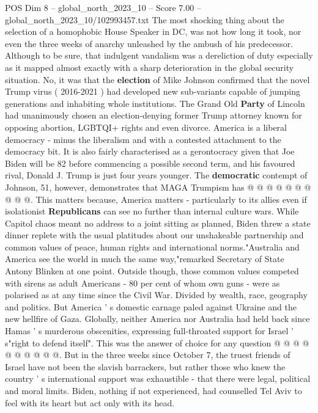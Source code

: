 \begin{textsample}{POS Dim 8 – global\_north\_2023\_10 – Score 7.00 – global\_north\_2023\_10/102993457.txt}  \label{ex:f8_pos_243}
The most shocking thing about the selection of a homophobic House Speaker in DC, was not how long it took, nor even the three weeks of anarchy unleashed by the ambush of his predecessor.
Although to be sure, that indulgent vandalism was a dereliction of duty especially as it mapped almost exactly with a sharp deterioration in the global security situation.
No, it was that the \textbf{election} of Mike Johnson confirmed that the novel Trump virus ( 2016-2021 ) had developed new sub-variants capable of jumping generations and inhabiting whole institutions.
The Grand Old \textbf{Party} of Lincoln had unanimously chosen an election-denying former Trump attorney known for opposing abortion, LGBTQI+ rights and even divorce.
America is a liberal democracy - minus the liberalism and with a contested attachment to the democracy bit.
It is also fairly characterised as a gerontocracy given that Joe Biden will be 82 before commencing a possible second term, and his favoured rival, Donald J.
Trump is just four years younger.
The \textbf{democratic} contempt of Johnson, 51, however, demonstrates that MAGA Trumpism has @ @ @ @ @ @ @ @ @ @.
This matters because, America matters - particularly to its allies even if isolationist \textbf{Republicans} can see no further than internal culture wars.
While Capitol chaos meant no address to a joint sitting as planned, Biden threw a state dinner replete with the usual platitudes about our unshakeable partnership and common values of peace, human rights and international norms."Australia and America see the world in much the same way,"remarked Secretary of State Antony Blinken at one point.
Outside though, those common values competed with sirens as adult Americans - 80 per cent of whom own guns - were as polarised as at any time since the Civil War.
Divided by wealth, race, geography and politics.
But America ' s domestic carnage paled against Ukraine and the new hellfire of Gaza.
Globally, neither America nor Australia had held back since Hamas ' s murderous obscenities, expressing full-throated support for Israel ' s"right to defend itself".
This was the answer of choice for any question @ @ @ @ @ @ @ @ @ @.
But in the three weeks since October 7, the truest friends of Israel have not been the slavish barrackers, but rather those who knew the country ' s international support was exhaustible - that there were legal, political and moral limits.
Biden, nothing if not experienced, had counselled Tel Aviv to feel with its heart but act only with its head.

\end{textsample}
